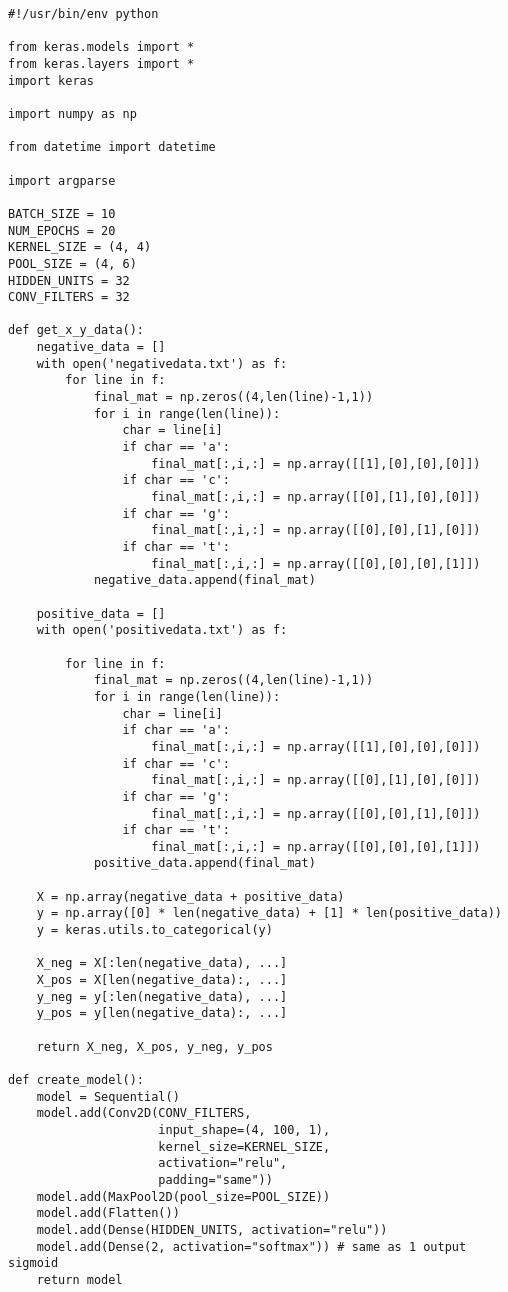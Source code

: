 \documentclass{article}[11pt]
\begin{document}
\begin{verbatim}
#!/usr/bin/env python

from keras.models import *
from keras.layers import *
import keras

import numpy as np

from datetime import datetime

import argparse

BATCH_SIZE = 10
NUM_EPOCHS = 20
KERNEL_SIZE = (4, 4)
POOL_SIZE = (4, 6)
HIDDEN_UNITS = 32
CONV_FILTERS = 32

def get_x_y_data():
    negative_data = []
    with open('negativedata.txt') as f:
        for line in f:
            final_mat = np.zeros((4,len(line)-1,1))
            for i in range(len(line)):
                char = line[i]
                if char == 'a':
                    final_mat[:,i,:] = np.array([[1],[0],[0],[0]])
                if char == 'c':
                    final_mat[:,i,:] = np.array([[0],[1],[0],[0]])
                if char == 'g':
                    final_mat[:,i,:] = np.array([[0],[0],[1],[0]])
                if char == 't':
                    final_mat[:,i,:] = np.array([[0],[0],[0],[1]])
            negative_data.append(final_mat)

    positive_data = []
    with open('positivedata.txt') as f:

        for line in f:
            final_mat = np.zeros((4,len(line)-1,1))
            for i in range(len(line)):
                char = line[i]
                if char == 'a':
                    final_mat[:,i,:] = np.array([[1],[0],[0],[0]])
                if char == 'c':
                    final_mat[:,i,:] = np.array([[0],[1],[0],[0]])
                if char == 'g':
                    final_mat[:,i,:] = np.array([[0],[0],[1],[0]])
                if char == 't':
                    final_mat[:,i,:] = np.array([[0],[0],[0],[1]])
            positive_data.append(final_mat)

    X = np.array(negative_data + positive_data)
    y = np.array([0] * len(negative_data) + [1] * len(positive_data))
    y = keras.utils.to_categorical(y)

    X_neg = X[:len(negative_data), ...]
    X_pos = X[len(negative_data):, ...]
    y_neg = y[:len(negative_data), ...]
    y_pos = y[len(negative_data):, ...]

    return X_neg, X_pos, y_neg, y_pos

def create_model():
    model = Sequential()
    model.add(Conv2D(CONV_FILTERS,
                     input_shape=(4, 100, 1),
                     kernel_size=KERNEL_SIZE,
                     activation="relu",
                     padding="same"))
    model.add(MaxPool2D(pool_size=POOL_SIZE))
    model.add(Flatten())
    model.add(Dense(HIDDEN_UNITS, activation="relu"))
    model.add(Dense(2, activation="softmax")) # same as 1 output sigmoid
    return model


\end{verbatim}
\end{document}
